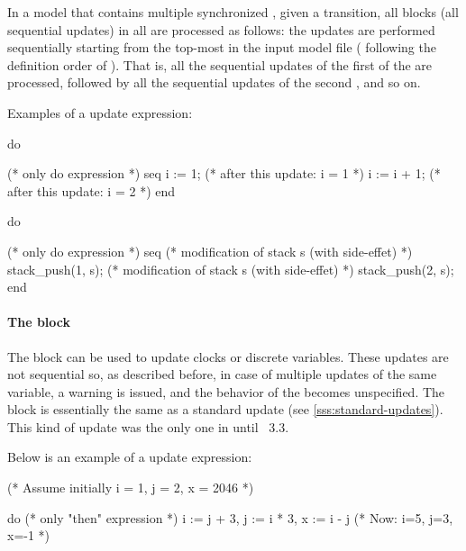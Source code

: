 In a model that contains multiple synchronized \IPTA{}, given a transition, all  blocks (all sequential updates) in all \IPTA{} are processed as follows:
the updates are performed sequentially starting from the top-most \IPTA{} in the input model file (\ie{} following the definition order of \IPTA{}).
That is, all the sequential updates of the first of the \IPTA{} are processed, followed by all  the sequential updates of the second \IPTA{}, and so on.


Examples of a  update expression:

\begin{IMITATORmodel}
	do {

		(* only do expression *)
		seq
			i := 1; (* after this update: i = 1 *)
			i := i + 1; (* after this update: i = 2 *)
		end

	}
\end{IMITATORmodel}

\begin{IMITATORmodel}
	do {

		(* only do expression *)
		seq
			(* modification of stack s (with side-effet) *)
			stack_push(1, s);
			(* modification of stack s (with side-effet) *)
			stack_push(2, s);
		end

	}
\end{IMITATORmodel}

\paragraph{The  block}

The  block can be used to update clocks or discrete variables.
These updates are not sequential so, as described before, in case of multiple updates of the same variable, a warning is issued, and the behavior of the \NIPTA{} becomes unspecified.
The  block is essentially the same as a standard update (see \cref{sss:standard-updates}).
This kind of update was the only one in \imitator{} until \imitator{}~3.3.

Below is an example of a  update expression:

\begin{IMITATORmodel}
	(* Assume initially i = 1, j = 2, x = 2046 *)

	do {
		(* only "then" expression *)
		i := j + 3,
		j := i * 3,
		x := i - j
	}
	(* Now: i=5, j=3, x=-1 *)
\end{IMITATORmodel}



